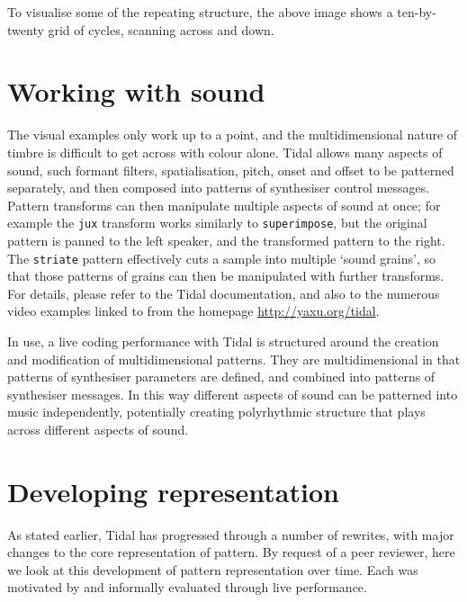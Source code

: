 \documentclass[authoryear,preprint]{sigplanconf}
\begin{document}
To visualise some of the repeating structure, the above image shows a
ten-by-twenty grid of cycles, scanning across and down.

\section{Working with sound}


The visual examples only work up to a point, and the multidimensional
nature of timbre is difficult to get across with colour alone. Tidal
allows many aspects of sound, such formant filters, spatialisation,
pitch, onset and offset to be patterned separately, and then composed
into patterns of synthesiser control messages. Pattern transforms can
then manipulate multiple aspects of sound at once; for example the
\lstinline{jux} transform works similarly to \lstinline{superimpose},
but the original pattern is panned to the left speaker, and the
transformed pattern to the right. The \lstinline{striate} pattern
effectively cuts a sample into multiple `sound grains', so that those
patterns of grains can then be manipulated with further
transforms. For details, please refer to the Tidal documentation, and
also to the numerous video examples linked to from the homepage
\url{http://yaxu.org/tidal}.

In use, a live coding performance with Tidal is structured around the
creation and modification of multidimensional patterns. They are
multidimensional in that patterns of synthesiser parameters are
defined, and combined into patterns of synthesiser messages. In this
way different aspects of sound can be patterned into music
independently, potentially creating polyrhythmic structure that plays
across different aspects of sound.


\section{Developing representation}
\label{tidaldev}

As stated earlier, Tidal has progressed through a number of rewrites,
with major changes to the core representation of pattern. By request
of a peer reviewer, here we look at this development of pattern
representation over time. Each was motivated by and informally
evaluated through live performance. 
\end{document}
